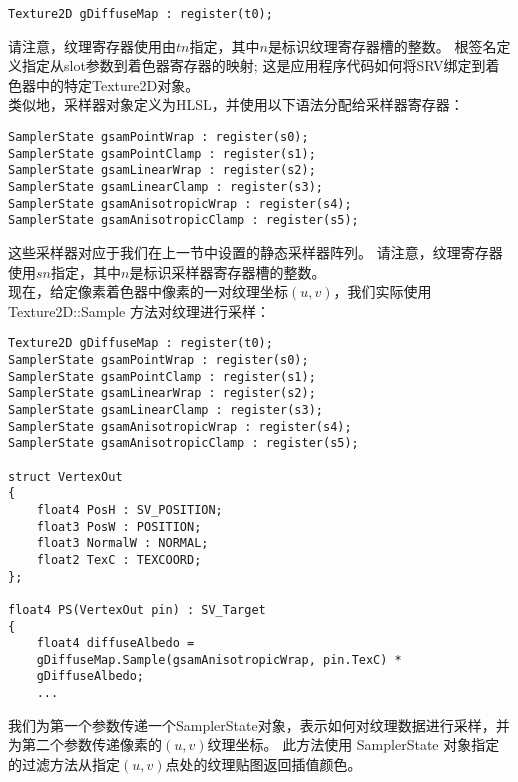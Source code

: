 \begin{lstlisting}
Texture2D gDiffuseMap : register(t0);
\end{lstlisting}

\begin{flushleft}
请注意，纹理寄存器使用由$tn$指定，其中$n$是标识纹理寄存器槽的整数。 根签名定义指定从slot参数到着色器寄存器的映射; 这是应用程序代码如何将SRV绑定到着色器中的特定Texture2D对象。\\

类似地，采样器对象定义为HLSL，并使用以下语法分配给采样器寄存器：\\
\end{flushleft}

\begin{lstlisting}
SamplerState gsamPointWrap : register(s0);
SamplerState gsamPointClamp : register(s1);
SamplerState gsamLinearWrap : register(s2);
SamplerState gsamLinearClamp : register(s3);
SamplerState gsamAnisotropicWrap : register(s4);
SamplerState gsamAnisotropicClamp : register(s5);
\end{lstlisting}

\begin{flushleft}
这些采样器对应于我们在上一节中设置的静态采样器阵列。 请注意，纹理寄存器使用$sn$指定，其中$n$是标识采样器寄存器槽的整数。\\
现在，给定像素着色器中像素的一对纹理坐标$(u,v)$，我们实际使用 Texture2D::Sample 方法对纹理进行采样：\\
\end{flushleft}

\begin{lstlisting}
Texture2D gDiffuseMap : register(t0);
SamplerState gsamPointWrap : register(s0);
SamplerState gsamPointClamp : register(s1);
SamplerState gsamLinearWrap : register(s2);
SamplerState gsamLinearClamp : register(s3);
SamplerState gsamAnisotropicWrap : register(s4);
SamplerState gsamAnisotropicClamp : register(s5);

struct VertexOut
{
    float4 PosH : SV_POSITION;
    float3 PosW : POSITION;
    float3 NormalW : NORMAL;
    float2 TexC : TEXCOORD;
};

float4 PS(VertexOut pin) : SV_Target
{
    float4 diffuseAlbedo =
    gDiffuseMap.Sample(gsamAnisotropicWrap, pin.TexC) *
    gDiffuseAlbedo;
    ...
\end{lstlisting}

\begin{flushleft}
我们为第一个参数传递一个SamplerState对象，表示如何对纹理数据进行采样，并为第二个参数传递像素的$(u,v)$纹理坐标。 此方法使用 SamplerState 对象指定的过滤方法从指定$(u,v)$点处的纹理贴图返回插值颜色。\\
\end{flushleft}


